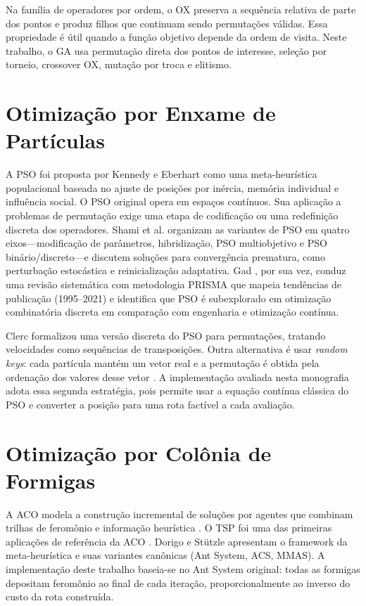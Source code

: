 Na família de operadores por ordem, o \ac{OX} preserva a sequência relativa de parte dos pontos e produz filhos que continuam sendo permutações válidas. Essa propriedade é útil quando a função objetivo depende da ordem de visita. Neste trabalho, o \ac{GA} usa permutação direta dos pontos de interesse, seleção por torneio, crossover \ac{OX}, mutação por troca e elitismo.

\section{Otimização por Enxame de Partículas}
\label{sec:pso}

A \ac{PSO} foi proposta por Kennedy e Eberhart \cite{kennedy1995particle} como uma meta-heurística populacional baseada no ajuste de posições por inércia, memória individual e influência social. O \ac{PSO} original opera em espaços contínuos. Sua aplicação a problemas de permutação exige uma etapa de codificação ou uma redefinição discreta dos operadores. Shami et al. \cite{shami2022pso} organizam as variantes de \ac{PSO} em quatro eixos---modificação de parâmetros, hibridização, \ac{PSO} multiobjetivo e \ac{PSO} binário/discreto---e discutem soluções para convergência prematura, como perturbação estocástica e reinicialização adaptativa. Gad \cite{gad2022pso}, por sua vez, conduz uma revisão sistemática com metodologia PRISMA que mapeia tendências de publicação (1995--2021) e identifica que \ac{PSO} é subexplorado em otimização combinatória discreta em comparação com engenharia e otimização contínua.

Clerc \cite{clerc2000discretepso} formalizou uma versão discreta do \ac{PSO} para permutações, tratando velocidades como sequências de transposições. Outra alternativa é usar \textit{random keys}: cada partícula mantém um vetor real e a permutação é obtida pela ordenação dos valores desse vetor \cite{bean1994genetic}. A implementação avaliada nesta monografia adota essa segunda estratégia, pois permite usar a equação contínua clássica do \ac{PSO} e converter a posição para uma rota factível a cada avaliação.

\section{Otimização por Colônia de Formigas}
\label{sec:aco}

A \ac{ACO} modela a construção incremental de soluções por agentes que combinam trilhas de feromônio e informação heurística \cite{dorigo1996ant}. O \ac{TSP} foi uma das primeiras aplicações de referência da \ac{ACO} \cite{dorigo1997ant}. Dorigo e Stützle \cite{dorigo2004book} apresentam o framework da meta-heurística e suas variantes canônicas (Ant System, ACS, MMAS). A implementação deste trabalho baseia-se no Ant System original: todas as formigas depositam feromônio ao final de cada iteração, proporcionalmente ao inverso do custo da rota construída.

